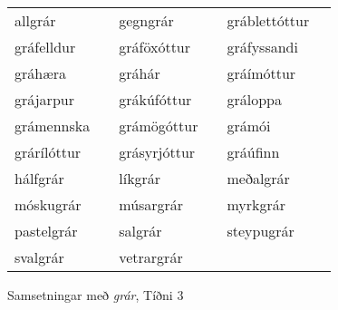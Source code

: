 \documentclass[../samsetningasafn.tex]{subfiles}
\begin{document}
\begin{wordlist}[H]
\begin{tcolorbox}
	\setlength{\extrarowheight}{3pt}
	\begin{tabular}{BlBlBl}		
		allgrár		& 		& 		
		gegngrár	& 		& 		
		gráblettóttur	& 		\\ 		
		gráfelldur	&		& 		
		gráföxóttur	&		& 	
		gráfyssandi	& 		\\ 		
		gráhæra		&		& 	
		gráhár		&		& 		
		gráímóttur	&		\\ 	
		grájarpur	&		& 		
		grákúfóttur	&		& 		
		gráloppa	&		\\ 		
		grámennska	&		& 		
		grámögóttur	&		& 		
		grámói		&		\\ 	
		grárílóttur	&		& 	
		grásyrjóttur	&		& 		
		gráúfinn		&		\\ 		
		hálfgrár		&		& 		
		líkgrár		&		& 		
		meðalgrár	&		\\ 	
		móskugrár	&		& 	
		músargrár	&		& 	
		myrkgrár	&		\\ 		
		pastelgrár	&		& 	
		salgrár		&		& 		
		steypugrár	&		\\ 	
		svalgrár		&		& 		
		vetrargrár	&		& 	
					&
	\end{tabular}

\end{tcolorbox}
	\caption{Samsetningar með \textit{grár}, Tíðni 3}
	\label{listi:gratt.3}
\end{wordlist}
\end{document}
